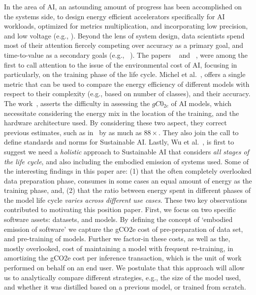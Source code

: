 {{        In the area of AI, an astounding amount of progress has been accomplished on the systems side, to design energy efficient accelerators specifically for AI workloads, optimized for metrics multiplication, and incorporating low precision, and low voltage (e.g., \cite{Agrawal2016,Brooks2000}). Beyond the lens of system design, data scientists spend most of their attention fiercely competing over accuracy as a primary goal, and time-to-value as a secondary goals (e.g., ~\cite{Liu2019}). The papers ~\cite{Strubell2019} and ~\cite{Schwartz2019}, were among the first to call attention to the issue of the environmental cost of AI, focusing in particularly, on the training phase of the life cycle. {Michel et al.}~\cite{Lenherr2021}, offers a single metric that can be used to compare the energy efficiency of different models with respect to their complexity (e.g., based on number of classes), and their accuracy. The work~\cite{Patterson2021}, asserts the difficulty in assessing the $gC0_{2e}$ of AI models, which necessitate considering the energy mix in the location of the training, and the hardware architecture used. By considering these two aspect, they correct previous estimates, such as in~\cite{Strubell2019} by as much as $88 \times$. They also join the call to define standards and norms for Sustainable AI. Lastly, {Wu et al.}~\cite{Wu2022}, is first to suggest we need a \textit{holistic} approach to Sustainable AI that considers \textit{all stages of the life cycle}, and also including the embodied emission of systems used. Some of the interesting findings in this paper are: (1) that the often completely overlooked data preparation phase, consumes in some cases an equal amount of energy as the training phase, and, (2) that the ratio between energy spent in different phases of the model life cycle  \textit{varies across different use cases}. These two key observations contributed to motivating this position paper. First, we focus on two specific software assets: datasets, and models. By defining the concept of `embodied emission of software' we capture the gCO2e cost of pre-preparation of data set, and pre-training of models. Further we factor-in these costs, as well as the, mostly overlooked, cost of maintaining a model with frequent re-training, in amortizing the gCO2e cost per inference transaction, which is the unit of work performed on behalf on an end user. We postulate that this  approach will allow us to analytically compare different strategies, e.g., the size of the model used, and whether it was distilled based on a previous model, or trained from scratch.
    }

}
